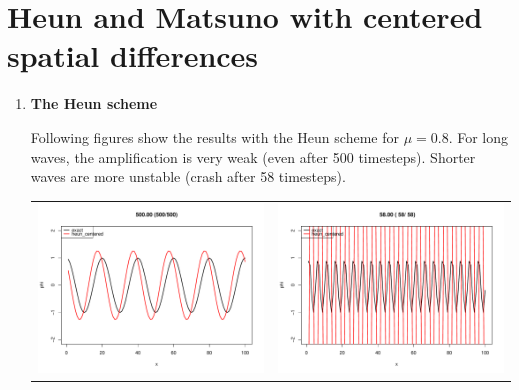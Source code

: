 \documentclass[a4paper,fleqn]{article}
\begin{document}
%
\section{Heun and Matsuno with centered spatial differences}
%

\begin{enumerate}
	\item \textbf{The Heun scheme}
		\par
		Following figures show the results with the Heun scheme for $\mu=0.8$. For long waves, the amplification is very weak (even after 500 timesteps). Shorter waves are more unstable (crash after 58 timesteps).
		\begin{center}
			\hspace*{-50mm}
			\begin{tabular}{cc}
				\includegraphics[scale=0.3]{heun_long}	&	\includegraphics[scale=0.3]{heun_short}\\

\end{tabular}
\end{center}
\end{enumerate}
\end{document}
